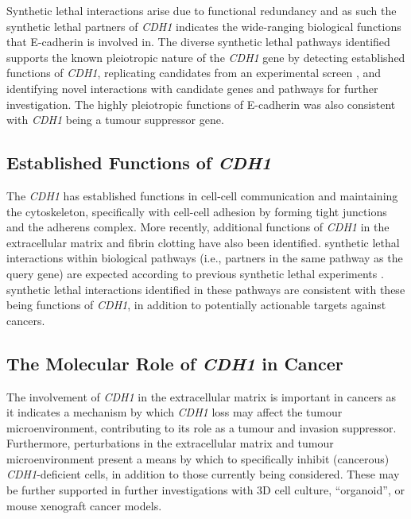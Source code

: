 Synthetic lethal interactions arise due to \gls{functional redundancy} \citep{Boone2007, Kaelin2005, Fece2015} and as such the \gls{synthetic lethal} partners of \textit{CDH1} indicates the wide-ranging biological functions that \gls{E-cadherin} is involved in. The diverse \gls{synthetic lethal} pathways identified supports the known pleiotropic nature of the \textit{CDH1} gene by detecting established functions of \textit{CDH1}, replicating candidates from an experimental screen \citep{Telford2015}, and identifying novel interactions with candidate genes and pathways for further investigation. The highly pleiotropic functions of \gls{E-cadherin} was also consistent with \textit{CDH1} being a \gls{tumour suppressor} gene. %

\subsection{Established Functions of \textit{CDH1}}
\label{chapt6:function}

The \textit{CDH1} has established functions in cell-cell communication and maintaining the cytoskeleton, specifically with cell-cell adhesion by forming tight junctions and the adherens complex. More recently, additional functions of \textit{CDH1} in the extracellular matrix and fibrin clotting have also been identified. \Gls{synthetic lethal} interactions within biological pathways (i.e., partners in the same pathway as the query gene) are expected according to previous \gls{synthetic lethal} experiments \citep{Kelley2005, Boone2007}. \Gls{synthetic lethal} interactions identified in these pathways are consistent with these being functions of \textit{CDH1}, in addition to potentially actionable targets against cancers.


\subsection{The Molecular Role of \textit{CDH1} in Cancer}
\label{chapt6:cancer}

The involvement of \textit{CDH1} in the extracellular matrix is important in cancers as it indicates a mechanism by which \textit{CDH1} loss may affect the tumour microenvironment, contributing to its role as a tumour and invasion suppressor. Furthermore, perturbations in the extracellular matrix and tumour microenvironment present a means by which to specifically inhibit (cancerous) \textit{CDH1}-deficient cells, in addition to those currently being considered. 
These may be further supported in further investigations with 3D cell culture, ``organoid'', or mouse xenograft cancer models.

